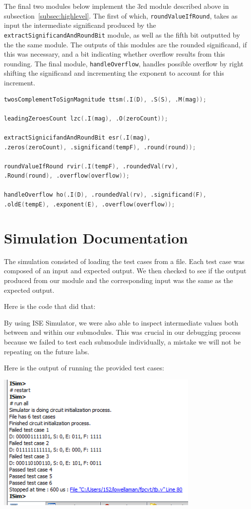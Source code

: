 \documentclass[]{article}
\begin{document}
The final two modules below implement the 3rd module described above in subsection~\ref{subsec:highlevel}. The first of which, \texttt{roundValueIfRound}, takes as input the intermediate significand produced by the \texttt{extractSignificand\-AndRoundBit} module, as well as the fifth bit outputted by the the same module. The outputs of this modules are the rounded significand, if this was necessary, and a bit indicating whether overflow results from this rounding. The final module, \texttt{handleOverflow}, handles possible overflow by right shifting the significand and incrementing the exponent to account for this increment.

\begin{lstlisting}[frame=single, language=verilog, caption= Excerpt from main \texttt{fpcvt.v} module.]
twosComplementToSignMagnitude ttsm(.I(D), .S(S), .M(mag));

leadingZeroesCount lzc(.I(mag), .O(zeroCount));

extractSignicifandAndRoundBit esr(.I(mag),
.zeros(zeroCount), .significand(tempF), .round(round));

roundValueIfRound rvir(.I(tempF), .roundedVal(rv),
.Round(round), .overflow(overflow));

handleOverflow ho(.I(D), .roundedVal(rv), .significand(F),
.oldE(tempE), .exponent(E), .overflow(overflow));
\end{lstlisting}

\section{Simulation Documentation}

The simulation consisted of loading the test cases from a file. Each test case was composed of an input and expected output. We then checked to see if the output produced from our module and the corresponding input was the same as the expected output.

Here is the code that did that:



By using ISE Simulator, we were also able to inspect intermediate values both between and within our submodules. This was crucial in our debugging process because we failed to test each submodule individually, a mistake we will not be repeating on the future labs.

Here is the output of running the provided test cases:

\includegraphics[width=10cm]{output.PNG}
\end{document}
